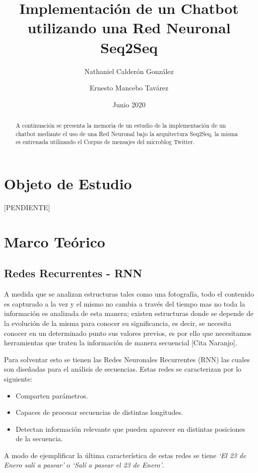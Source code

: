 \documentclass[12pt, letterpaper]{article}
\title{Implementación de un Chatbot utilizando una Red Neuronal Seq2Seq}
\author[1]{Nathaniel Calderón González}
\author[2]{Ernesto Mancebo Tavárez}
\affil[1]{MULCIA, Universidad de Sevilla, Sevilla, España}
\date{Junio 2020}
\begin{document}
    \begin{titlepage}
        \maketitle
        \begin{abstract}
            A continuación se presenta la memoria de un estudio de la implementación de un chatbot mediante el uso de una Red Neuronal bajo la arquitectura Seq2Seq, la misma es entrenada utilizando el Corpus de mensajes del microblog Twitter.
        \end{abstract}
    \end{titlepage}

    \tableofcontents
    \pagebreak

    \section{Objeto de Estudio}
    [PENDIENTE]
    
    \section{Marco Teórico}
    \subsection{Redes Recurrentes - RNN}
        A medida que se analizan estructuras tales como una fotografía, todo el contenido es capturado a la vez y el mismo no cambia a través del tiempo mas no toda la información es analizada de esta manera; existen estructuras donde se depende de la evolución de la misma para conocer su significancia, es decir, se necesita conocer en un determinado punto sus valores previos, es por ello que necesitamos herramientas que traten la información de manera secuencial [Cita Naranjo].
    
        Para solventar esto se tienen las Redes Neuronales Recurrentes (RNN) las cuales son diseñadas para el análisis de secuencias. Estas redes se caracterizan por lo siguiente:
        
        \begin{itemize}
            \item Comparten parámetros.
            \item Capaces de procesar secuencias de distintas longitudes.
            \item Detectan información relevante que pueden aparecer en distintas posiciones de la secuencia.
        \end{itemize}
        A modo de ejemplificar la última característica de estas redes se tiene \emph{`El 23 de Enero salí a pasear'} o \emph{`Salí a pasear el 23 de Enero'}. 
    
\end{document}
